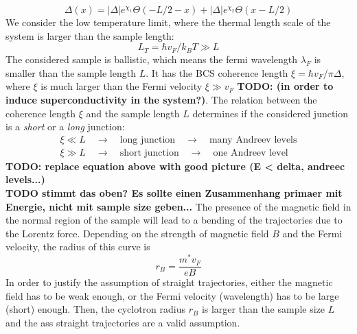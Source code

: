 \begin{equation}
\Delta\left( x \right) = |\Delta| e^{\chi_1} \Theta\left(-L/2 -x \right) + |\Delta| e^{\chi_2} \Theta\left(x-L/2 \right) 
\label{eq:gap_parameter}
\end{equation}
We consider the low temperature limit, where the thermal length scale of the system is larger than the sample length:
\begin{equation}
L_T = \hbar v_F / k_B T \gg L
\end{equation}
The considered sample is ballistic, which means the fermi wavelength $\lambda_F$ is smaller than the sample length $L$. It has the BCS coherence length $\xi = \hbar v_F / \pi \Delta$, where $\xi$ is much larger than the Fermi velocity $\xi \gg v_F$ 
\textbf{TODO: (in order to induce superconductivity in the system?)}. 
The relation between the coherence length $\xi$ and the sample length $L$ determines if the considered junction is a \textit{short} or a \textit{long} junction:
\begin{eqnarray*}
\xi \ll L \quad \rightarrow \quad \text{long junction} \quad \rightarrow \quad \text{many Andreev levels} \\ 
\xi \gg L \quad \rightarrow \quad \text{short junction} \quad \rightarrow \quad \text{one Andreev level} 
\end{eqnarray*}
\textbf{TODO: replace equation above with good picture (E < delta, andreec levels...)}\\
\textbf{TODO stimmt das oben? Es sollte einen Zusammenhang primaer mit Energie, nicht mit sample size geben...}
The presence of the magnetic field in the normal region of the sample will lead to a bending of the trajectories due to the Lorentz force. Depending on the strength of magnetic field $B$ and the Fermi velocity, the radius of this curve is 
\begin{equation}
r_B = \frac{m^* v_F}{e B}
\end{equation}
In order to justify the assumption of straight trajectories, either the magnetic field has to be weak enough, or the Fermi velocity (wavelength) has to be large (short) enough. Then, the cyclotron radius $r_B$ is larger than the sample size $L$ and the ass straight trajectories are a valid assumption. 


